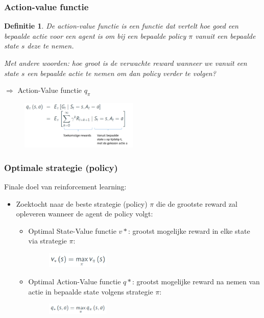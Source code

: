 \documentclass{article}
\newtheorem{theorem}{Definitie}[section]
\begin{document}
\subsubsection{Action-value functie}

\begin{theorem}
    De action-value functie is een functie dat vertelt hoe goed een bepaalde actie voor een agent is
    om bij een bepaalde policy $\pi$ vanuit een bepaalde state $s$ deze te nemen.

    Met andere woorden: hoe groot is de verwachte reward wanneer we vanuit een
    state $s$ een bepaalde actie te nemen om dan policy verder te volgen?
\end{theorem}

$\Rightarrow$ Action-Value functie $q_{\pi}$

\begin{figure}[H]
    \centering
    \includegraphics[width=0.5\textwidth]{action-value-function.png}
\end{figure}

\subsubsection{Optimale strategie (policy)}

Finale doel van reinforcement learning:

\begin{itemize}
    \item Zoektocht naar de beste strategie (policy) $\pi$ die de grootste reward zal opleveren wanneer de agent de policy volgt:
    \begin{itemize}
        \item Optimal State-Value functie $v*$: grootst mogelijke reward in elke state via strategie $\pi$:
        \begin{figure}[H]
            \centering
            \includegraphics[width=0.3\textwidth]{vmax.png}
        \end{figure}
        \item Optimal Action-Value functie $q*$: grootst mogelijke reward na nemen van actie in bepaalde state volgens strategie $\pi$:
        \begin{figure}[H]
            \centering
            \includegraphics[width=0.3\textwidth]{qmax.png}
        \end{figure}        
    \end{itemize}
\end{itemize}
\end{document}
